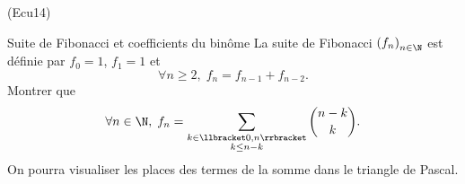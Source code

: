 \begin{tiny}(Ecu14)\end{tiny} Suite de Fibonacci et coefficients du binôme \newline
La suite de Fibonacci $\left( f_n \right)_{n \in \N}$ est définie par $f_0 = 1$, $f_1 = 1$ et
\[
 \forall n \geq2, \; f_n = f_{n-1} + f_{n-2}.
\]
Montrer que
\[
 \forall n \in \N, \; f_n 
 =
 \sum_{\substack{k \in \llbracket 0, n \rrbracket \\ k \leq n -k}}\binom{n-k}{k}.
\]
On pourra visualiser les places des termes de la somme dans le triangle de Pascal.